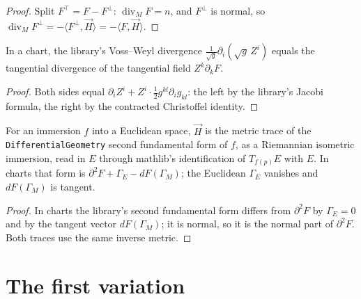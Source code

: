 \begin{proof}
  \leanok
  Split $F^\top = F - F^\perp$: $\operatorname{div}_M F = n$, and $F^\perp$ is normal, so $\operatorname{div}_M F^\perp = -\langle F^\perp, \vec H\rangle = -\langle F, \vec H\rangle$.
\end{proof}

\begin{theorem}
  \label{thm:voss-weyl}
  \leanok
  In a chart, the library's Voss--Weyl divergence
  $\frac{1}{\sqrt g}\partial_i(\sqrt g\,Z^i)$ equals the tangential divergence of the
  tangential field $Z^k \partial_k F$.
\end{theorem}

\begin{proof}
  \leanok
  Both sides equal $\partial_i Z^i + Z^i \cdot \tfrac12 g^{kl}\partial_i g_{kl}$: the left by the library's Jacobi formula, the right by the contracted Christoffel identity.
\end{proof}

\begin{theorem}
  \label{thm:mean-curvature-bridge}
  \leanok
  For an immersion $f$ into a Euclidean space, $\vec H$ is the metric trace of the
  \texttt{DifferentialGeometry} second fundamental form of $f$, as a Riemannian isometric
  immersion, read in $E$ through mathlib's identification of $T_{f(p)}E$ with $E$. In charts
  that form is $\partial^2 F + \Gamma_E - dF(\Gamma_M)$; the Euclidean
  $\Gamma_E$ vanishes and $dF(\Gamma_M)$ is tangent.
\end{theorem}

\begin{proof}
  \leanok
  In charts the library's second fundamental form differs from $\partial^2 F$ by $\Gamma_E = 0$ and by the tangent vector $dF(\Gamma_M)$; it is normal, so it is the normal part of $\partial^2 F$. Both traces use the same inverse metric.
\end{proof}

\section{The first variation}


